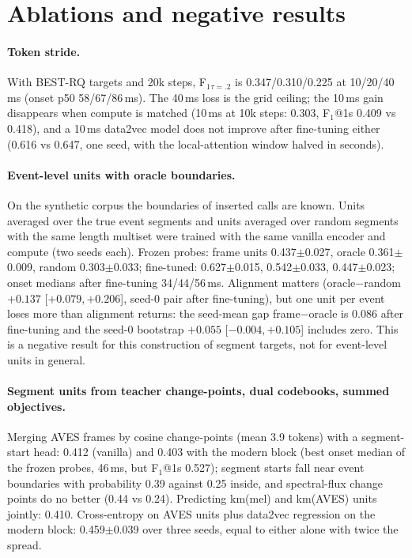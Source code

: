 \documentclass[10pt,twocolumn]{article}
\newcommand{\Fone}{F$_1$}
\begin{document}
\section{Ablations and negative results}
\paragraph{Token stride.} With BEST-RQ targets and 20k steps, \Fone{}$_{\tau=.2}$ is 0.347/0.310/0.225 at 10/20/40\,ms (onset p50 58/67/86\,ms). The 40\,ms loss is the grid ceiling; the 10\,ms gain disappears when compute is matched (10\,ms at 10k steps: 0.303, \Fone{}@1s 0.409 vs 0.418), and a 10\,ms data2vec model does not improve after fine-tuning either (0.616 vs 0.647, one seed, with the local-attention window halved in seconds).
\paragraph{Event-level units with oracle boundaries.} On the synthetic corpus the boundaries of inserted calls are known. Units averaged over the true event segments and units averaged over random segments with the same length multiset were trained with the same vanilla encoder and compute (two seeds each). Frozen probes: frame units 0.437$\pm$0.027, oracle 0.361$\pm$0.009, random 0.303$\pm$0.033; fine-tuned: 0.627$\pm$0.015, 0.542$\pm$0.033, 0.447$\pm$0.023; onset medians after fine-tuning 34/44/56\,ms. Alignment matters (oracle$-$random $+0.137$ [$+0.079,+0.206$], seed-0 pair after fine-tuning), but one unit per event loses more than alignment returns: the seed-mean gap frame$-$oracle is 0.086 after fine-tuning and the seed-0 bootstrap $+0.055$ [$-0.004,+0.105$] includes zero. This is a negative result for this construction of segment targets, not for event-level units in general.
\paragraph{Segment units from teacher change-points, dual codebooks, summed objectives.} Merging AVES frames by cosine change-points (mean 3.9 tokens) with a segment-start head: 0.412 (vanilla) and 0.403 with the modern block (best onset median of the frozen probes, 46\,ms, but \Fone{}@1s 0.527); segment starts fall near event boundaries with probability 0.39 against 0.25 inside, and spectral-flux change points do no better (0.44 vs 0.24). Predicting km(mel) and km(AVES) units jointly: 0.410. Cross-entropy on AVES units plus data2vec regression on the modern block: 0.459$\pm$0.039 over three seeds, equal to either alone with twice the spread.
\end{document}
